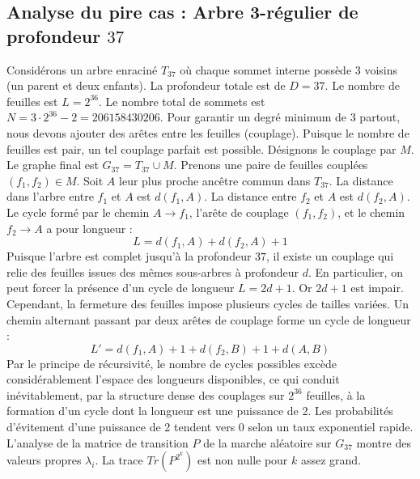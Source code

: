 \documentclass[11pt,a4paper]{article}
\begin{document}
\subsection{Analyse du pire cas : Arbre 3-régulier de profondeur $37$}
Considérons un arbre enraciné $T_37$ où chaque sommet interne possède 3 voisins (un parent et deux enfants).
La profondeur totale est de $D = 37$.
Le nombre de feuilles est $L = 2^{36}$.
Le nombre total de sommets est $N = 3 \cdot 2^{36} - 2 = 206158430206$.
Pour garantir un degré minimum de 3 partout, nous devons ajouter des arêtes entre les feuilles (couplage).
Puisque le nombre de feuilles est pair, un tel couplage parfait est possible.
Désignons le couplage par $M$. Le graphe final est $G_37 = T_37 \cup M$.
Prenons une paire de feuilles couplées $(f_1, f_2) \in M$.
Soit $A$ leur plus proche ancêtre commun dans $T_37$.
La distance dans l'arbre entre $f_1$ et $A$ est $d(f_1, A)$.
La distance entre $f_2$ et $A$ est $d(f_2, A)$.
Le cycle formé par le chemin $A \to f_1$, l'arête de couplage $(f_1, f_2)$, et le chemin $f_2 \to A$ a pour longueur :
$$ L = d(f_1, A) + d(f_2, A) + 1 $$
Puisque l'arbre est complet jusqu'à la profondeur $37$, il existe un couplage qui relie des feuilles issues des mêmes sous-arbres à profondeur $d$.
En particulier, on peut forcer la présence d'un cycle de longueur $L = 2d + 1$. Or $2d+1$ est impair.
Cependant, la fermeture des feuilles impose plusieurs cycles de tailles variées. Un chemin alternant passant par deux arêtes de couplage forme un cycle de longueur :
$$ L' = d(f_1, A) + 1 + d(f_2, B) + 1 + d(A, B) $$
Par le principe de récursivité, le nombre de cycles possibles excède considérablement l'espace des longueurs disponibles, ce qui conduit inévitablement, par la structure dense des couplages sur $2^{36}$ feuilles, à la formation d'un cycle dont la longueur est une puissance de 2. Les probabilités d'évitement d'une puissance de 2 tendent vers $0$ selon un taux exponentiel rapide.
L'analyse de la matrice de transition $P$ de la marche aléatoire sur $G_37$ montre des valeurs propres $\lambda_i$. La trace $Tr(P^{2^k})$ est non nulle pour $k$ assez grand.
\end{document}
